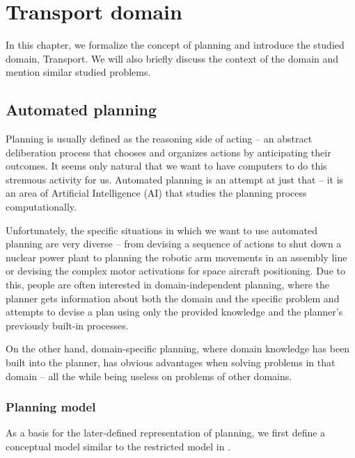 \chapter{Transport domain}

In this chapter, we formalize the concept of planning and introduce the studied domain, Transport.
We will also briefly discuss the context of the domain and mention similar studied problems.

\section{Automated planning}

Planning is usually defined as the reasoning side of acting -- an abstract deliberation
process that chooses and organizes actions by anticipating their outcomes. \cite[Section~1.1]{Ghallab2004}
It seems only natural that we want to have computers to do this strenuous activity for us.
Automated planning is an attempt at just that -- it is an area of Artificial Intelligence (AI) that
studies the planning process computationally. \cite[Section~1.1]{Ghallab2004}

Unfortunately, the specific situations in which we want to use automated planning are very diverse --
from devising a sequence of actions to shut down a nuclear power plant to planning the robotic arm
movements in an assembly line or devising the complex motor activations for space aircraft positioning.
Due to this, people are often interested in domain-independent planning, where the planner gets information
about both the domain and the specific problem and attempts to devise a plan using only the provided knowledge
and the planner's previously built-in processes. \cite[Section~1.3]{Ghallab2004}

On the other hand, domain-specific planning, where domain knowledge has been built into the planner,
has obvious advantages when solving problems in that domain -- all the while being useless on problems of other
domains. \cite[Section~1.3]{Ghallab2004}

\subsection{Planning model}

As a basis for the later-defined representation of planning, we first define
a conceptual model similar to the restricted model in \cite[Section~1.4, Section~1.5]{Ghallab2004}.

